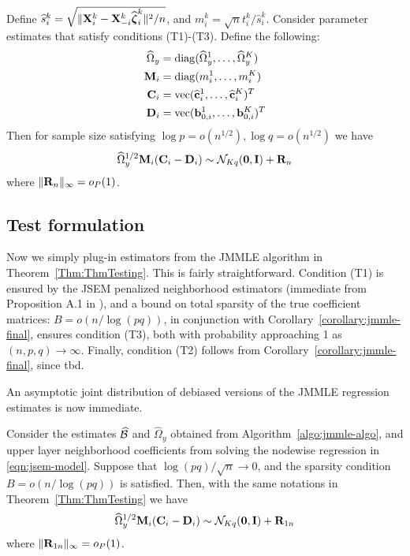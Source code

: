 \begin{Theorem}\label{Thm:ThmTesting}
Define $\widehat s_i^k = \sqrt{\| {\mathbf{X}}_i^k - {\mathbf{X}}_{-i}^k \widehat {{\boldsymbol{\zeta}}}_i^k \|^2/n}$, and $m_i^k = \sqrt n t_i^k / \widehat s_i^k$. Consider parameter estimates that satisfy conditions (T1)-(T3). Define the following:
%
\begin{align*}
\widehat \Omega_y &= \operatorname*{diag}(\widehat \Omega_y^1, \ldots, \widehat \Omega_y^K)\\
{\mathbf{M}}_i &= \operatorname*{diag}(m_i^1, \ldots, m_i^K)\\
{\mathbf{C}}_i &= \operatorname*{vec}(\widehat {{\bf{c}}}_i^1, \ldots, \widehat {{\bf{c}}}_i^K)^T\\
{\mathbf{D}}_i &= \operatorname*{vec}({\bf{b}}_{0,i}^1, \ldots, {\bf{b}}_{0,i}^K)^T\\
\end{align*}
%
Then for sample size satisfying $\log p = o(n^{1/2}), \log q = o(n^{1/2})$ we have
%
\begin{align}\label{eqn:ThmTestingEqn}
\widehat \Omega_y^{1/2} {\mathbf{M}}_i ({\mathbf{C}}_i - {\mathbf{D}}_i) \sim
{\cal{N}}_{Kq} ({\bf 0}, {\mathbf{I}}) + {\mathbf{R}}_n
\end{align}
%
where $\| {\mathbf{R}}_n \|_\infty = o_P(1)$.
\end{Theorem}
%

\subsection{Test formulation}
\label{sec:testing-subsec-2}
Now we simply plug-in estimators from the JMMLE algorithm in Theorem~\ref{Thm:ThmTesting}. This is fairly straightforward. Condition (T1) is ensured by the JSEM penalized neighborhood estimators (immediate from Proposition A.1 in \cite{MaMichailidis15}), and a bound on total sparsity of the true coefficient matrices: $B = o(n/ \log(pq))$, in conjunction with Corollary~\ref{corollary:jmmle-final}, ensures condition (T3), both with probability approaching 1 as $(n,p,q) \rightarrow \infty$. Finally, condition (T2) follows from Corollary~\ref{corollary:jmmle-final}, since {\colrbf tbd}.

An asymptotic joint distribution of debiased versions of the JMMLE regression estimates is now immediate.
%
\begin{Corollary}\label{corollary:CorTesting}
Consider the estimates $\widehat {{\cal{B}}}$ and $\widehat \Omega_y $ obtained from Algorithm~\ref{algo:jmmle-algo}, and upper layer neighborhood coefficients from solving the nodewise regression in \eqref{eqn:jsem-model}. Suppose that $\log (pq) /\sqrt n \rightarrow 0$, and the sparsity condition $B = o(n / \log(pq))$ is satisfied. Then, with the same notations in Theorem~\ref{Thm:ThmTesting} we have
%
\begin{align}\label{eqn:CorTestingEqn}
\widehat \Omega_y^{1/2} {\mathbf{M}}_i ({\mathbf{C}}_i - {\mathbf{D}}_i) \sim
{\cal{N}}_{Kq} ({\bf 0}, {\mathbf{I}}) + {\mathbf{R}}_{1n}
\end{align}
%
where $\| {\mathbf{R}}_{1n} \|_\infty = o_P(1)$.
\end{Corollary}

